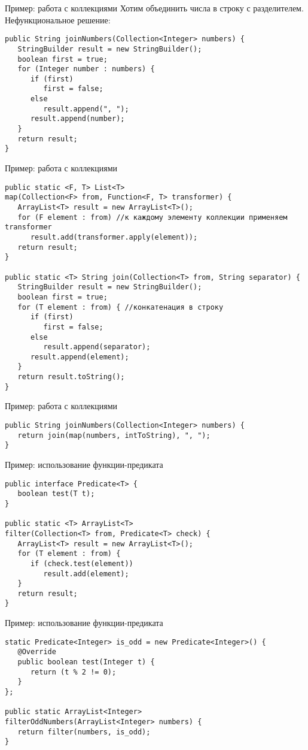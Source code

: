 \documentclass[aspectratio=169]{beamer}
\begin{document}
\begin{frame}[fragile]{Пример: работа с коллекциями}
	Хотим объединить числа в строку с разделителем. Нефункциональное решение:
	\begin{verbatim}
public String joinNumbers(Collection<Integer> numbers) {
   StringBuilder result = new StringBuilder();
   boolean first = true;
   for (Integer number : numbers) {
      if (first)
         first = false;
      else
         result.append(", ");
      result.append(number);
   }
   return result;
}
	\end{verbatim}

\end{frame}

\begin{frame}[fragile]{Пример: работа с коллекциями}
	\begin{verbatim}
public static <F, T> List<T>
map(Collection<F> from, Function<F, T> transformer) {
   ArrayList<T> result = new ArrayList<T>();
   for (F element : from) //к каждому элементу коллекции применяем transformer
      result.add(transformer.apply(element));
   return result;
}

public static <T> String join(Collection<T> from, String separator) {
   StringBuilder result = new StringBuilder();
   boolean first = true;
   for (T element : from) { //конкатенация в строку
      if (first)
         first = false;
      else
         result.append(separator);
      result.append(element);
   }
   return result.toString();
}
	\end{verbatim}
\end{frame}

\begin{frame}[fragile]{Пример: работа с коллекциями}
	\begin{verbatim}
public String joinNumbers(Collection<Integer> numbers) {
   return join(map(numbers, intToString), ", ");
}
	\end{verbatim}
\end{frame}

\begin{frame}[fragile]{Пример: использование функции-предиката}
	\begin{verbatim}
public interface Predicate<T> {
   boolean test(T t);
}

public static <T> ArrayList<T> 
filter(Collection<T> from, Predicate<T> check) {
   ArrayList<T> result = new ArrayList<T>();
   for (T element : from) {
      if (check.test(element))
         result.add(element);
   }
   return result;
}
	\end{verbatim}
\end{frame}

\begin{frame}[fragile]{Пример: использование функции-предиката}
	\begin{verbatim}
static Predicate<Integer> is_odd = new Predicate<Integer>() { 
   @Override
   public boolean test(Integer t) {
      return (t % 2 != 0);
   }
};

public static ArrayList<Integer> 
filterOddNumbers(ArrayList<Integer> numbers) {
   return filter(numbers, is_odd);
}
	\end{verbatim}
\end{frame}
\end{document}
